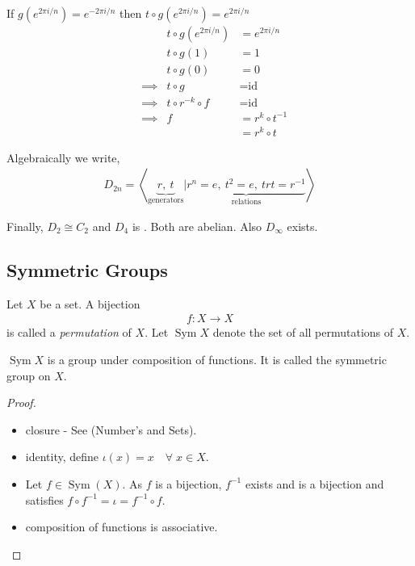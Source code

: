 If $g(e^{2 \pi i /n}) = e^{-2 \pi i /n}$ then $t \circ g(e^{2 \pi i / n}) = e^{2 \pi i / n}$
\begin{align*}
    && t \circ g(e^{2 \pi i / n}) &= e^{2 \pi i / n} \\
    && t \circ g (1) &= 1 \\
    && t \circ g (0) &= 0 \\
    &\implies & t \circ g &= \text{id} \\
    &\implies & t \circ r^{-k} \circ f &= \text{id} \\
    &\implies & f &= r^{k} \circ t^{-1} \\
    && &= r^k \circ t
\end{align*}

Algebraically we write,
\begin{align*}
    D_{2n} = \left\langle \underbrace{r,\ t}_\text{generators} | \underbrace{r^n = e,\ t^2 = e,\ trt = r^{-1}}_\text{relations} \right\rangle 
\end{align*}

Finally, $D_2 \cong C_2$ and $D_4$ is .
Both are abelian.
Also $D_\infty$ exists.

\hypertarget{symmetric-groups}{%
\subsection{Symmetric Groups}\label{symmetric-groups}}

\begin{definition}[permutation] \label{def:permutation}
Let $X$ be a set.
A bijection \begin{align*}
    f: X \to X
\end{align*} is called a \emph{permutation} of $X$.
Let $\operatorname{Sym} X$ denote the set of all permutations of $X$.
\end{definition} 

\begin{proposition}
$\operatorname{Sym} X$ is a group under composition of functions. It is called the symmetric group on $X$.
\end{proposition}

\begin{proof} ~
\begin{itemize}
\item
  closure - See  (Number's and Sets).
\item
  identity, define $\iota (x) = x \quad \forall \; x \in X$.
\item
  Let $f \in \operatorname{Sym}(X)$.
  As $f$ is a bijection, $f^{-1}$ exists and is a bijection and satisfies $f \circ f^{-1} = \iota = f^{-1} \circ f$.
\item
  composition of functions is associative.
\end{itemize}
\end{proof}

